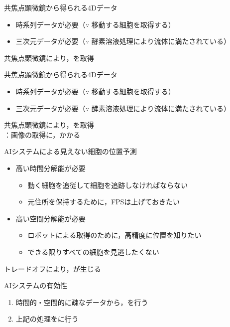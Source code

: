 \begin{frame}{共焦点顕微鏡から得られる4Dデータ}
    \begin{itemize}
        \item 時系列データが必要（$\because$ 移動する細胞を取得する）
        \item 三次元データが必要（$\because$ 酵素溶液処理により流体に満たされている）
    \end{itemize}
    \ra 共焦点顕微鏡により，を取得
    \\
\end{frame}
\begin{frame}[noframenumbering]{共焦点顕微鏡から得られる4Dデータ}
    \begin{itemize}
        \item 時系列データが必要（$\because$ 移動する細胞を取得する）
        \item 三次元データが必要（$\because$ 酵素溶液処理により流体に満たされている）
    \end{itemize}
    \ra 共焦点顕微鏡により，を取得
    \\\ra {}：画像の取得に，かかる
\end{frame}

\begin{frame}{AIシステムによる見えない細胞の位置予測}
    \begin{itemize}
        \item 高い時間分解能が必要
        \begin{itemize}
            \item 動く細胞を追従して細胞を追跡しなければならない
            \item 元住所を保持するために，FPSは上げておきたい
        \end{itemize}
        \vs
        \item 高い空間分解能が必要
        \begin{itemize}
            \item ロボットによる取得のために，高精度に位置を知りたい
            \item できる限りすべての細胞を見逃したくない
        \end{itemize}
    \end{itemize}
    \Ra トレードオフにより，が生じる
    \vs
    \begin{block}{AIシステムの有効性}
        \begin{enumerate}
            \item 時間的・空間的に疎なデータから，を行う
            \item 上記の処理をに行う
        \end{enumerate}
    \end{block}
\end{frame}